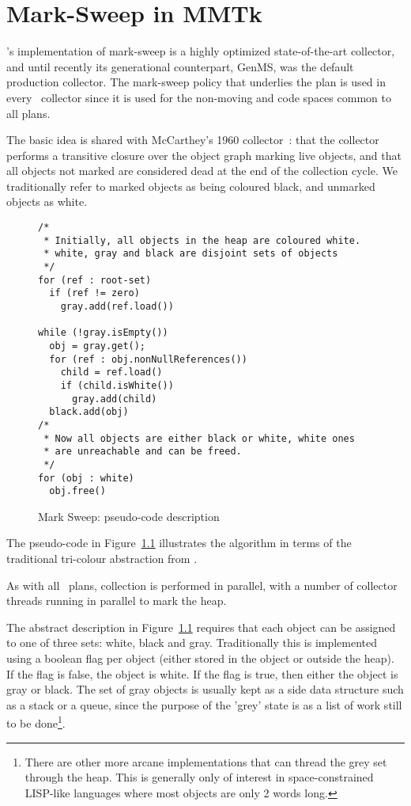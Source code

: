 \chapter{Mark-Sweep in MMTk}

\label{chap:mark-sweep}

\mmtk's implementation of mark-sweep is a highly optimized state-of-the-art
collector, and until recently its generational counterpart, GenMS, was the
default production collector.  The mark-sweep policy that underlies the
plan is used in every \mmtk\ collector since it is used for the non-moving and
code spaces common to all plans.

The basic idea is shared with McCarthey's 1960 collector~\citep{McCarthy:60}:
that the collector performs a transitive closure over the object graph marking 
live objects, and that all objects not marked are considered dead
at the end of the collection cycle.  We traditionally refer to marked objects as
being coloured black, and unmarked objects as white.
\begin{figure}
\begin{lstlisting}
/* 
 * Initially, all objects in the heap are coloured white.
 * white, gray and black are disjoint sets of objects
 */              
for (ref : root-set)
  if (ref != zero)
    gray.add(ref.load())

while (!gray.isEmpty())
  obj = gray.get();
  for (ref : obj.nonNullReferences())
    child = ref.load()
    if (child.isWhite())
      gray.add(child)
  black.add(obj)
/*
 * Now all objects are either black or white, white ones
 * are unreachable and can be freed.
 */
for (obj : white)
  obj.free()
\end{lstlisting}
\caption{Mark Sweep: pseudo-code description}
\label{fig:ms:pseudo}
\end{figure}
The pseudo-code in Figure~\ref{fig:ms:pseudo} illustrates the algorithm in terms
of the traditional tri-colour abstraction from \cite{DLM+:76}.  

As with all \mmtk\ plans, collection is performed in parallel, with a number of
collector threads running in parallel to mark the heap.

The abstract description in Figure~\ref{fig:ms:pseudo} requires that each object
can be assigned to one of three sets: white, black and gray.  Traditionally this
is implemented using a boolean flag per object (either stored in the object or
outside the heap).  If the flag is false, the object is white.  If the flag is
true, then either the object is gray or black.  The set of gray objects is
usually kept as a side data structure such as a stack or a
queue, since the purpose of the 'grey' state is as a list of work
still to be done\footnote{There are other more arcane implementations that can
thread the grey set through the heap.  This is generally only of interest in 
space-constrained LISP-like languages where most objects are only 2 words long.}.

